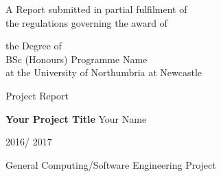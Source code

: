 
\begin{titlepage}
\Large
A Report submitted in partial fulfilment of\\
 the regulations governing the award of
\par
the Degree of\\[5mm]
{\huge	 BSc (Honours) Programme Name }\\[5mm]
at the University of Northumbria at Newcastle
\par
\vspace*{1in}
{\Large Project Report}
\par\vspace{1em}
{\Huge \bfseries Your Project Title}
\vfill
Your Name
\par\vspace{1em}
2016/ 2017
\par\vspace{1em}
General Computing/Software Engineering Project
\end{titlepage}

